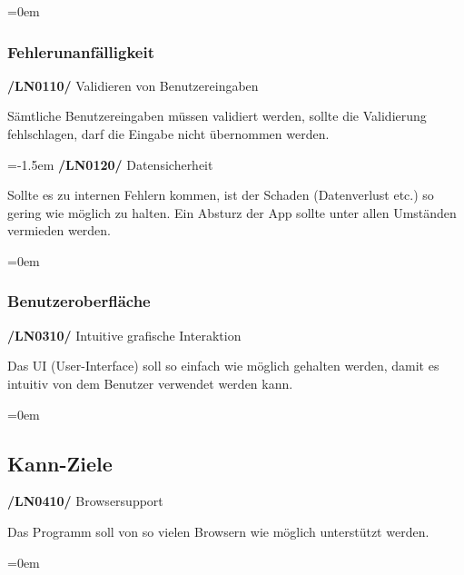 \documentclass[11pt,a4paper]{report}
\begin{document}
\leftskip=0em
\subsubsection{Fehlerunanfälligkeit}

\textbf{/LN0110/} Validieren von Benutzereingaben
\par
\begingroup
\leftskip=1cm
\noindent Sämtliche Benutzereingaben müssen validiert werden, sollte die Validierung fehlschlagen, darf die Eingabe nicht übernommen werden.\\
\par
\endgroup

\leftskip=-1.5em
\textbf{/LN0120/} Datensicherheit
\par
\begingroup
\leftskip=1cm
\noindent Sollte es zu internen Fehlern kommen, ist der Schaden (Datenverlust etc.) so gering wie möglich zu halten.
Ein Absturz der App sollte unter allen Umständen vermieden werden.\\
\par
\endgroup

\leftskip=0em
\subsubsection{Benutzeroberfläche}

\textbf{/LN0310/} Intuitive grafische Interaktion
\par
\begingroup
\leftskip=1cm
\noindent Das UI (User-Interface) soll so einfach wie möglich gehalten werden, damit es intuitiv von dem Benutzer verwendet werden kann.\\
\par
\endgroup

\leftskip=0em
\subsection{Kann-Ziele}
\textbf{/LN0410/} Browsersupport
\par
\begingroup
\leftskip=1cm
\noindent Das Programm soll von so vielen Browsern wie möglich unterstützt werden.\\
\par
\endgroup

\newpage
\leftskip=0em
\end{document}
